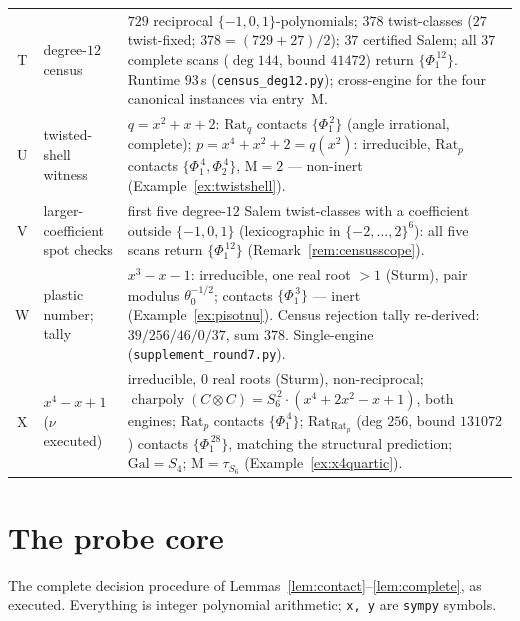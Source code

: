 \documentclass[11pt]{article}
\theoremstyle{plain}
\theoremstyle{definition}
\theoremstyle{remark}
\newcommand{\Mah}{\mathrm{M}}
\newcommand{\Rat}{\mathrm{Rat}}
\begin{document}
\begin{center}
\begin{tabular}{clp{9.2cm}}
T & degree-$12$ census & $729$ reciprocal $\{-1,0,1\}$-polynomials; $378$
twist-classes ($27$ twist-fixed; $378=(729+27)/2$); $37$ certified Salem;
all $37$ complete scans ($\deg144$, bound $41472$) return
$\{\Phi_1^{\,12}\}$. Runtime $93$\,s (\texttt{census\_deg12.py});
cross-engine for the four canonical instances via entry~M.\\[2pt]
U & twisted-shell witness & $q=x^2+x+2$: $\Rat_q$ contacts
$\{\Phi_1^{\,2}\}$ (angle irrational, complete); $p=x^4+x^2+2=q(x^2)$:
irreducible, $\Rat_p$ contacts $\{\Phi_1^{\,4},\Phi_2^{\,4}\}$,
$\Mah=2$ --- non-inert (Example~\ref{ex:twistshell}).\\[2pt]
V & larger-coefficient spot checks & first five degree-$12$ Salem
twist-classes with a coefficient outside $\{-1,0,1\}$ (lexicographic in
$\{-2,\dots,2\}^6$): all five scans return $\{\Phi_1^{\,12}\}$
(Remark~\ref{rem:censusscope}).\\[2pt]
W & plastic number; tally & $x^3-x-1$: irreducible, one real root $>1$
(Sturm), pair modulus $\theta_0^{-1/2}$; contacts $\{\Phi_1^{\,3}\}$ ---
inert (Example~\ref{ex:pisotnu}). Census rejection tally re-derived:
$39/256/46/0/37$, sum $378$. Single-engine
(\texttt{supplement\_round7.py}).\\[2pt]
X & $x^4-x+1$ ($\nu$ executed) & irreducible, $0$ real roots (Sturm),
non-reciprocal; $\operatorname{charpoly}(C\otimes C)
=S_6^{\,2}\cdot(x^4+2x^2-x+1)$, both engines; $\Rat_p$ contacts
$\{\Phi_1^{\,4}\}$; $\Rat_{\Rat_p}$ (deg $256$, bound $131072$) contacts
$\{\Phi_1^{\,28}\}$, matching the structural prediction;
$\mathrm{Gal}=S_4$; $\Mah=\tau_{S_6}$ (Example~\ref{ex:x4quartic}).\\
\hline
\end{tabular}
\end{center}

\section{The probe core}\label{app:probe}

The complete decision procedure of
Lemmas~\ref{lem:contact}--\ref{lem:complete}, as executed. Everything is
integer polynomial arithmetic; \texttt{x, y} are \texttt{sympy} symbols.
\end{document}
